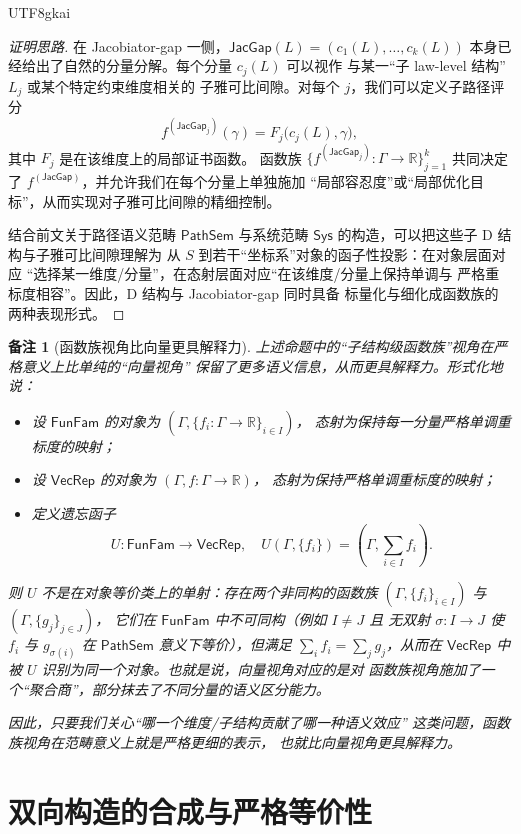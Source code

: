 \documentclass[12pt]{article}
\newtheorem{remark}{备注}[section]
\newcommand{\JacGap}{\mathsf{JacGap}}
\begin{document}
\begin{CJK*}{UTF8}{gkai}
\begin{proof}[证明思路]
在 Jacobiator-gap 一侧，$\JacGap(L)=(c_1(L),\dots,c_k(L))$
本身已经给出了自然的分量分解。每个分量 $c_j(L)$ 可以视作
与某一“子 law-level 结构” $L_j$ 或某个特定约束维度相关的
子雅可比间隙。对每个 $j$，我们可以定义子路径评分
\[
  f^{(\JacGap_j)}(\gamma)
  =
  F_j\bigl(c_j(L),\gamma\bigr),
\]
其中 $F_j$ 是在该维度上的局部证书函数。
函数族
$\{f^{(\JacGap_j)}:\Gamma\to\mathbb{R}\}_{j=1}^k$
共同决定了 $f^{(\JacGap)}$，并允许我们在每个分量上单独施加
“局部容忍度”或“局部优化目标”，从而实现对子雅可比间隙的精细控制。

结合前文关于路径语义范畴 $\mathsf{PathSem}$ 与系统范畴
$\mathsf{Sys}$ 的构造，可以把这些子 D 结构与子雅可比间隙理解为
从 $S$ 到若干“坐标系”对象的函子性投影：在对象层面对应
“选择某一维度/分量”，在态射层面对应“在该维度/分量上保持单调与
严格重标度相容”。因此，D 结构与 Jacobiator-gap 同时具备
标量化与细化成函数族的两种表现形式。
\end{proof}

\begin{remark}[函数族视角比向量更具解释力]
上述命题中的“子结构级函数族”视角在严格意义上比单纯的“向量视角”
保留了更多语义信息，从而更具解释力。形式化地说：
\begin{itemize}
  \item 设 $\mathsf{FunFam}$ 的对象为
        $(\Gamma,\{f_i:\Gamma\to\mathbb{R}\}_{i\in I})$，
        态射为保持每一分量严格单调重标度的映射；
  \item 设 $\mathsf{VecRep}$ 的对象为 $(\Gamma,f:\Gamma\to\mathbb{R})$，
        态射为保持严格单调重标度的映射；
  \item 定义遗忘函子
        \[
          U:\mathsf{FunFam}\longrightarrow\mathsf{VecRep},\quad
          U(\Gamma,\{f_i\})=(\Gamma,\sum_{i\in I} f_i).
        \]
\end{itemize}
则 $U$ 不是在对象等价类上的单射：存在两个非同构的函数族
  $(\Gamma,\{f_i\}_{i\in I})$ 与 $(\Gamma,\{g_j\}_{j\in J})$，
  它们在 $\mathsf{FunFam}$ 中不可同构（例如 $I\neq J$ 且
  无双射 $\sigma:I\to J$ 使 $f_i$ 与 $g_{\sigma(i)}$ 在
  $\mathsf{PathSem}$ 意义下等价），但满足
  $\sum_i f_i = \sum_j g_j$，从而在 $\mathsf{VecRep}$ 中
  被 $U$ 识别为同一个对象。也就是说，向量视角对应的是对
  函数族视角施加了一个“聚合商”，部分抹去了不同分量的语义区分能力。

因此，只要我们关心“哪一个维度/子结构贡献了哪一种语义效应”
这类问题，函数族视角在范畴意义上就是严格更细的表示，
也就比向量视角更具解释力。
\end{remark}

\section{双向构造的合成与严格等价性}


\end{CJK*}
\end{document}
